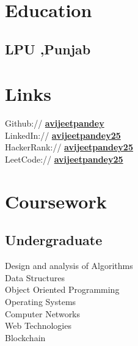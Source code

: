 \documentclass[]{deedy-resume-openfont}
\begin{document}
%
%
\lastupdated

%
%

%
%

\begin{minipage}[t]{0.33\textwidth} 


\section{Education} 

\subsection{LPU ,Punjab}
\sectionsep


\section{Links} 
Github:// \href{https://github.com/avijeetpandey}{\bf avijeetpandey} \\
LinkedIn://  \href{https://www.linkedin.com/in/avijeetpandey25}{\bf avijeetpandey25} \\
HackerRank:// \href{https://www.hackerrank.com/avijeetpandey25}{\bf avijeetpandey25} \\
LeetCode:// \href{https://leetcode.com/avijeetpandey25/}{\bf avijeetpandey25} \\


\section{Coursework}
\subsection{Undergraduate}
Design and analysis of Algorithms \\
Data Structures \\
Object Oriented Programming \\
Operating Systems \\
Computer Networks \\
Web Technologies \\
Blockchain \\


\end{minipage}
\end{document}
